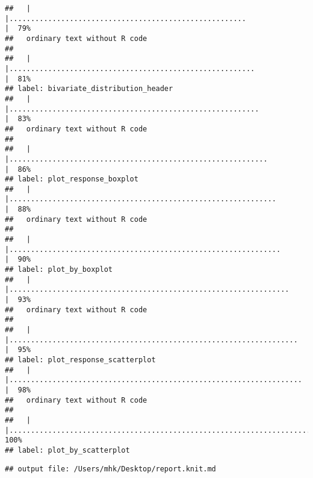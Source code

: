 \documentclass[
]{article}
\begin{document}
\begin{verbatim}
##   |                                                                              |.......................................................               |  79%
##   ordinary text without R code
## 
##   |                                                                              |.........................................................             |  81%
## label: bivariate_distribution_header
##   |                                                                              |..........................................................            |  83%
##   ordinary text without R code
## 
##   |                                                                              |............................................................          |  86%
## label: plot_response_boxplot
##   |                                                                              |..............................................................        |  88%
##   ordinary text without R code
## 
##   |                                                                              |...............................................................       |  90%
## label: plot_by_boxplot
##   |                                                                              |.................................................................     |  93%
##   ordinary text without R code
## 
##   |                                                                              |...................................................................   |  95%
## label: plot_response_scatterplot
##   |                                                                              |....................................................................  |  98%
##   ordinary text without R code
## 
##   |                                                                              |......................................................................| 100%
## label: plot_by_scatterplot
\end{verbatim}

\begin{verbatim}
## output file: /Users/mhk/Desktop/report.knit.md
\end{verbatim}
\end{document}
